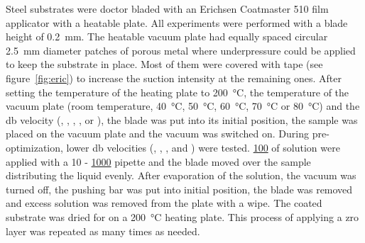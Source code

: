 Steel substrates were doctor bladed with an Erichsen Coatmaster 510 film applicator with a heatable plate.
All experiments were performed with a blade height of \SI{0.2}{\milli\meter}.
%
The heatable vacuum plate had equally spaced circular \SI{2.5}{\milli\meter} diameter patches of porous metal where underpressure could be applied to keep the substrate in place. 
Most of them were covered with tape (see figure~\ref{fig:eric}) to increase the suction intensity at the remaining ones.
After setting the temperature of the heating plate to \SI{200}{\celsius}, the temperature of the vacuum plate 
(room temperature, \SI{40}{\celsius}, \SI{50}{\celsius}, \SI{60}{\celsius}, \SI{70}{\celsius} or \SI{80}{\celsius}) 
and the \gls{db} velocity (, , , ,  or ), 
the blade was put into its initial position, the sample was placed on the vacuum plate and the vacuum 
was switched on. 
During pre-optimization, lower \gls{db} velocities (, , 
,  and ) were tested. 
\ul{100} of solution were 
applied with a 10 - \ul{1000} pipette and the blade moved over the sample distributing the liquid evenly. 
After evaporation of the solution, the vacuum was turned off, the pushing bar
was put into initial position, the blade was removed and excess solution was removed from the plate with a wipe. 
The coated substrate was dried for  on a \SI{200}{\celsius} heating plate.
This process of applying a \gls{zro} layer was repeated as many times as needed.
